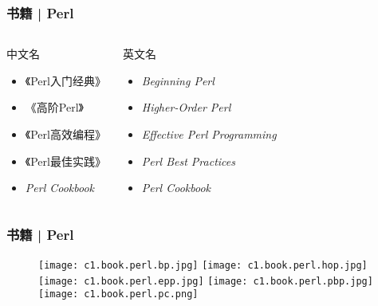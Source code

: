\begin{frame}
  \frametitle{书籍 | Perl}
  \begin{columns}
  \begin{block}{中文名}
    \begin{itemize}
      \item 《Perl入门经典》
      \item 《高阶Perl》
      \item 《Perl高效编程》
      \item 《Perl最佳实践》
      \item \textit{Perl Cookbook}
    \end{itemize}
  \end{block}
  \begin{block}{英文名}
    \begin{itemize}
      \item \textit{Beginning Perl}
      \item \textit{Higher-Order Perl}
      \item \textit{Effective Perl Programming}
      \item \textit{Perl Best Practices}
      \item \textit{Perl Cookbook}
    \end{itemize}
  \end{block}
\end{columns}
\end{frame}

\begin{frame}
  \frametitle{书籍 | Perl}
  \begin{figure}
    \centering
    \texttt{[image: c1.book.perl.bp.jpg]}\qquad
    \texttt{[image: c1.book.perl.hop.jpg]}\\
    \texttt{[image: c1.book.perl.epp.jpg]}\quad
    \texttt{[image: c1.book.perl.pbp.jpg]}\quad
    \texttt{[image: c1.book.perl.pc.png]}
  \end{figure}
\end{frame}

